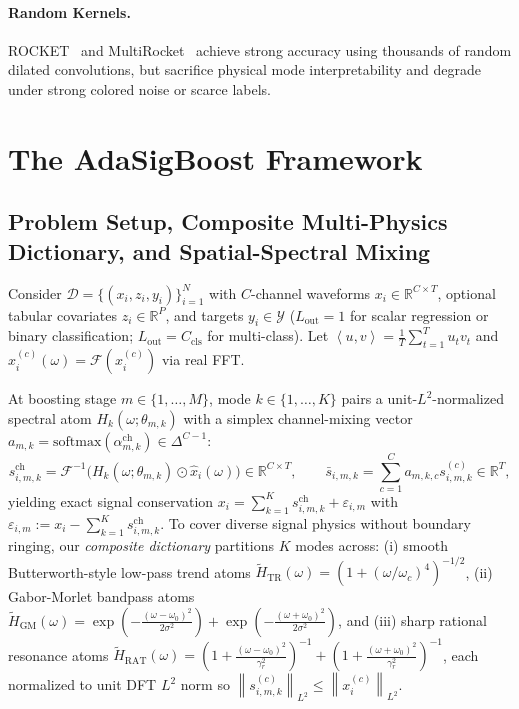 \documentclass[10pt]{article}
\newcommand{\R}{\mathbb{R}}
\newcommand{\norm}[1]{\left\lVert #1 \right\rVert}
\newcommand{\inner}[2]{\left\langle #1, #2 \right\rangle}
\begin{document}
\paragraph{Random Kernels.} ROCKET~\citep{dempster2020rocket} and MultiRocket~\citep{tan2022multirocket} achieve strong accuracy using thousands of random dilated convolutions, but sacrifice physical mode interpretability and degrade under strong colored noise or scarce labels.

\section{The AdaSigBoost Framework}
\label{sec:method}
\subsection{Problem Setup, Composite Multi-Physics Dictionary, and Spatial-Spectral Mixing}
Consider $\mathcal{D} = \{(x_i, z_i, y_i)\}_{i=1}^N$ with $C$-channel waveforms $x_i \in \R^{C \times T}$, optional tabular covariates $z_i \in \R^P$, and targets $y_i \in \mathcal{Y}$ ($L_{\mathrm{out}} = 1$ for scalar regression or binary classification; $L_{\mathrm{out}} = C_{\mathrm{cls}}$ for multi-class). Let $\inner{u}{v} = \frac{1}{T}\sum_{t=1}^T u_t v_t$ and $\hat{x}_i^{(c)}(\omega) = \mathcal{F}(x_i^{(c)})$ via real FFT.

At boosting stage $m \in \{1, \dots, M\}$, mode $k \in \{1, \dots, K\}$ pairs a unit-$L^2$-normalized spectral atom $H_k(\omega; \theta_{m,k})$ with a simplex channel-mixing vector $a_{m,k} = \mathrm{softmax}(\alpha_{m,k}^{\mathrm{ch}}) \in \Delta^{C-1}$:
\begin{equation}
    s_{i,m,k}^{\mathrm{ch}} = \mathcal{F}^{-1}\!\big(H_k(\omega; \theta_{m,k}) \odot \hat{x}_i(\omega)\big) \in \R^{C \times T}, \qquad \bar{s}_{i,m,k} = \sum_{c=1}^C a_{m,k,c} s_{i,m,k}^{(c)} \in \R^T,
\end{equation}
yielding exact signal conservation $x_i = \sum_{k=1}^K s_{i,m,k}^{\mathrm{ch}} + \varepsilon_{i,m}$ with $\varepsilon_{i,m} := x_i - \sum_{k=1}^K s_{i,m,k}^{\mathrm{ch}}$. To cover diverse signal physics without boundary ringing, our \emph{composite dictionary} partitions $K$ modes across: (i) smooth Butterworth-style low-pass trend atoms $\tilde{H}_{\mathrm{TR}}(\omega) = (1 + (\omega/\omega_c)^4)^{-1/2}$, (ii) Gabor-Morlet bandpass atoms $\tilde{H}_{\mathrm{GM}}(\omega) = \exp(-\frac{(\omega-\omega_0)^2}{2\sigma^2}) + \exp(-\frac{(\omega+\omega_0)^2}{2\sigma^2})$, and (iii) sharp rational resonance atoms $\tilde{H}_{\mathrm{RAT}}(\omega) = (1 + \frac{(\omega-\omega_0)^2}{\gamma_r^2})^{-1} + (1 + \frac{(\omega+\omega_0)^2}{\gamma_r^2})^{-1}$, each normalized to unit DFT $L^2$ norm so $\norm{s_{i,m,k}^{(c)}}_{L^2} \le \norm{x_i^{(c)}}_{L^2}$.
\end{document}
